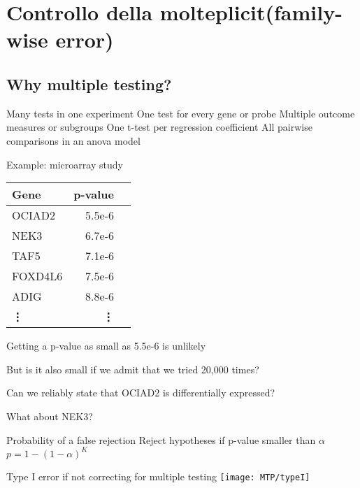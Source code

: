 \section{Controllo della molteplicit\al (family-wise error)}
\label{mtp}
\subsection{Why multiple testing?}

\begin{frame}{Many tests in one experiment}
    One test for every gene or probe
  \eb
    Multiple outcome measures or subgroups
  \eb
    One t-test per regression coefficient
  \eb
    All pairwise comparisons in an anova model
  \eb
\end{frame}


\begin{frame}{Example: microarray study}
    {\scriptsize\begin{tabular}{lrr}
    Gene & p-value  \\ \hline
  OCIAD2 &5.5e-6  \\
    NEK3 &6.7e-6  \\
    TAF5 &7.1e-6  \\
 FOXD4L6 &7.5e-6  \\
    ADIG &8.8e-6  \\
  \textbf{\vdots} & \textbf{\vdots} \\\hline
  \end{tabular}}
  \eb
    \bi
      \item Getting a p-value as small as 5.5e-6 is unlikely
      \item But is it also small if we admit that we tried 20,000 times?
      \item Can we reliably state that OCIAD2 is differentially expressed?
      \item What about NEK3?
    \ei
  \eb
\end{frame}

\begin{frame}{Probability of a false rejection}
    Reject hypotheses if p-value smaller than $\alpha$
  \eb
    $p = 1- (1-\alpha)^K$
  \eb
\end{frame}

\begin{frame}{Type I error if not correcting for multiple testing}%
\texttt{[image: MTP/typeI]}
\end{frame}


